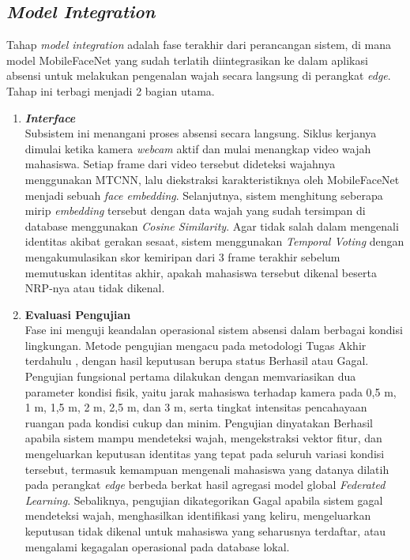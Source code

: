 \subsection{\textit{Model Integration}}
\label{subsec:model-integration-alur}

Tahap \textit{model integration} adalah fase terakhir dari perancangan sistem, di mana model MobileFaceNet yang sudah terlatih diintegrasikan ke dalam aplikasi absensi untuk melakukan pengenalan wajah secara langsung di perangkat \textit{edge}. Tahap ini terbagi menjadi 2 bagian utama.

\begin{enumerate}
  \item \textbf{\textit{Interface}} \\
  Subsistem ini menangani proses absensi secara langsung. Siklus kerjanya dimulai ketika kamera \textit{webcam} aktif dan mulai menangkap video wajah mahasiswa. Setiap frame dari video tersebut dideteksi wajahnya menggunakan MTCNN, lalu diekstraksi karakteristiknya oleh MobileFaceNet menjadi sebuah \textit{face embedding}. Selanjutnya, sistem menghitung seberapa mirip \textit{embedding} tersebut dengan data wajah yang sudah tersimpan di database menggunakan \textit{Cosine Similarity}. Agar tidak salah dalam mengenali identitas akibat gerakan sesaat, sistem menggunakan \textit{Temporal Voting} dengan mengakumulasikan skor kemiripan dari 3 frame terakhir sebelum memutuskan identitas akhir, apakah mahasiswa tersebut dikenal beserta NRP-nya atau tidak dikenal.

  \item \textbf{Evaluasi Pengujian} \\
  Fase ini menguji keandalan operasional sistem absensi dalam berbagai kondisi lingkungan. Metode pengujian mengacu pada metodologi Tugas Akhir terdahulu \parencite{Nagamas2022}, dengan hasil keputusan berupa status Berhasil atau Gagal. Pengujian fungsional pertama dilakukan dengan memvariasikan dua parameter kondisi fisik, yaitu jarak mahasiswa terhadap kamera pada 0,5 m, 1 m, 1,5 m, 2 m, 2,5 m, dan 3 m, serta tingkat intensitas pencahayaan ruangan pada kondisi cukup dan minim. Pengujian dinyatakan Berhasil apabila sistem mampu mendeteksi wajah, mengekstraksi vektor fitur, dan mengeluarkan keputusan identitas yang tepat pada seluruh variasi kondisi tersebut, termasuk kemampuan mengenali mahasiswa yang datanya dilatih pada perangkat \textit{edge} berbeda berkat hasil agregasi model global \textit{Federated Learning}. Sebaliknya, pengujian dikategorikan Gagal apabila sistem gagal mendeteksi wajah, menghasilkan identifikasi yang keliru, mengeluarkan keputusan tidak dikenal untuk mahasiswa yang seharusnya terdaftar, atau mengalami kegagalan operasional pada database lokal.


\end{enumerate}

